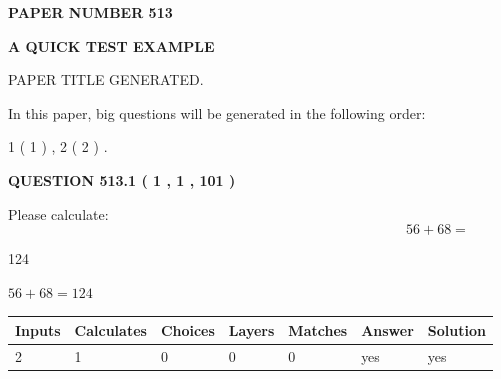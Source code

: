 \documentclass[12pt]{article}
\begin{document}
   
   
   
 {\textbf{ \Large{ PAPER NUMBER  513  }}}
   
   
\vspace{0.2in}
   
   
   
   
   
   
   
   
 \vspace{0.2in}
{\LARGE {\textbf{ A QUICK TEST EXAMPLE}}}
   
   
 PAPER TITLE GENERATED.
   
   
   
\vspace{0.2in}
   
In this paper, big questions will be generated in the following order: 
   
   
   1 ( 1 )
 ,
   2 ( 2 )
 .
  
\vspace{0.2in}
  
{\textbf{\Large{QUESTION
513.1 
 ( 1 , 1 , 101 )
}}}
  
  
 
Please calculate:
\begin{equation}
56 +  %
68 = \nonumber
\end{equation}
 
 
 
\noindent{}
 
 

124
 
 
\noindent{}
 
 

 
 
 
\noindent{}
 
 

$ %
56 +  %
68=   %
124$
 
 
\noindent{}
 
 

 
   
   
   
   
\noindent\begin{tabular}{|l|l|l|l|l|l|l|}
 \hline
Inputs & Calculates & Choices & Layers & Matches & Answer & Solution \\ \hline
 2  & 
 1  & 
 0
  & 
 0  & 
 0  & 
  yes & 
  yes 
  \\ \hline
 \end{tabular}
   
\end{document}
